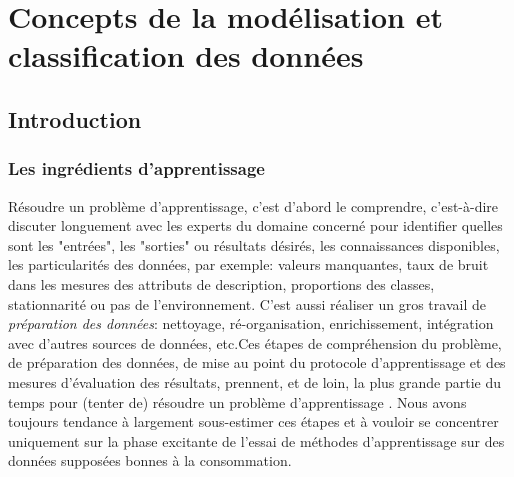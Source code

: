 	

		
%
%


\section{Concepts de la modélisation et classification des données}
	\subsection{Introduction}
	\subsubsection{Les ingrédients d'apprentissage}
		Résoudre un problème d'apprentissage, c'est d'abord le comprendre, c'est-à-dire discuter longuement avec les experts du domaine concerné pour identifier quelles sont les "entrées", les  "sorties" ou résultats désirés, les connaissances disponibles, les particularités des données, par exemple: valeurs manquantes, taux de bruit dans les mesures des attributs de description, proportions des classes, stationnarité ou pas de l'environnement. 
		C'est aussi réaliser un gros travail de \textit{préparation des données}: nettoyage, ré-organisation, enrichissement, intégration avec d'autres sources de données, etc.Ces étapes de compréhension du problème, de préparation des données, de mise au point du protocole d'apprentissage et des mesures d'évaluation des résultats, prennent, et de loin, la plus grande partie du temps pour (tenter de) résoudre un problème d'apprentissage \cite{antoine2018apprentissage}. 
		Nous avons toujours tendance à largement sous-estimer ces étapes et à vouloir se concentrer uniquement sur la phase excitante de l'essai de méthodes d'apprentissage sur des données supposées bonnes à la consommation. 
	
